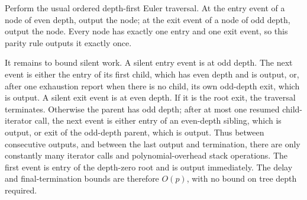 Perform the usual ordered depth-first Euler traversal. At the entry event of a node of even depth, output the node; at the exit event of a node of odd depth, output the node. Every node has exactly one entry and one exit event, so this parity rule outputs it exactly once.

It remains to bound silent work. A silent entry event is at odd depth. The next event is either the entry of its first child, which has even depth and is output, or, after one exhaustion report when there is no child, its own odd-depth exit, which is output. A silent exit event is at even depth. If it is the root exit, the traversal terminates. Otherwise the parent has odd depth; after at most one resumed child-iterator call, the next event is either entry of an even-depth sibling, which is output, or exit of the odd-depth parent, which is output. Thus between consecutive outputs, and between the last output and termination, there are only constantly many iterator calls and polynomial-overhead stack operations. The first event is entry of the depth-zero root and is output immediately. The delay and final-termination bounds are therefore \(O(p)\), with no bound on tree depth required.